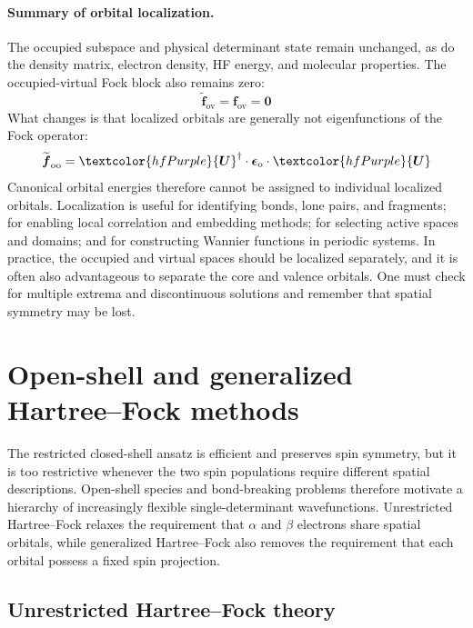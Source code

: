 \documentclass[11pt,a4paper,titlepage]{article}
\numberwithin{equation}{section}
\newcommand{\bff}{\boldsymbol{f}}
\newcommand{\bO}{\boldsymbol{0}}
\newcommand{\bU}{\boldsymbol{U}}
\newcommand{\beps}{\boldsymbol{\epsilon}}
\newcommand{\purple}[1]{\textcolor{hfPurple}{#1}}
\begin{document}
\paragraph{Summary of orbital localization.}

The occupied subspace and physical determinant state remain unchanged, as do the
density matrix, electron density, HF energy, and molecular properties. The
occupied-virtual Fock block also remains zero:
\begin{equation}
  \widetilde{\bff}_\text{ov}=\bff_\text{ov}=\bO
\end{equation}
What changes is that localized orbitals are generally not eigenfunctions of
the Fock operator:
\begin{equation}
  \widetilde{\bff}_\text{oo}
  =\purple{\bU}^\dagger\cdot\beps_\text{o}\cdot\purple{\bU}
\end{equation}
Canonical orbital energies therefore cannot be assigned to individual
localized orbitals.
Localization is useful for identifying bonds, lone pairs, and fragments; for
enabling local correlation and embedding methods; for selecting active spaces
and domains; and for constructing Wannier functions in periodic systems. In
practice, the occupied and virtual spaces should be localized separately, and
it is often also advantageous to separate the core and valence orbitals. One
must check for multiple extrema and discontinuous solutions and remember that
spatial symmetry may be lost.

\section{Open-shell and generalized Hartree--Fock methods}
\label{sec:open-shell-hf}

The restricted closed-shell ansatz is efficient and preserves spin symmetry,
but it is too restrictive whenever the two spin populations require different
spatial descriptions. Open-shell species and bond-breaking problems therefore
motivate a hierarchy of increasingly flexible single-determinant
wavefunctions. Unrestricted Hartree--Fock relaxes the requirement that
$\alpha$ and $\beta$ electrons share spatial orbitals, while generalized
Hartree--Fock also removes the requirement that each orbital possess a fixed
spin projection.

\subsection{Unrestricted Hartree--Fock theory}
\end{document}

